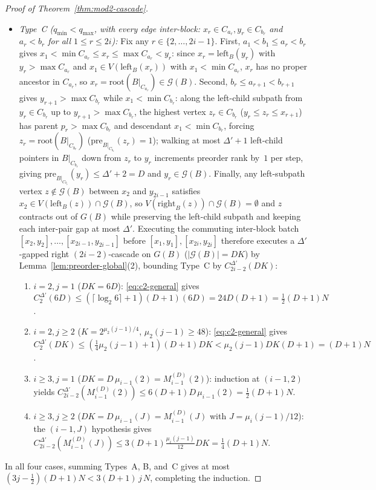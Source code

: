 \documentclass[11pt]{article}
\theoremstyle{definition}
\theoremstyle{remark}
\begin{document}
\begin{proof}[Proof of Theorem~\ref{thm:mod2-cascade}]
\begin{itemize}[leftmargin=2em]
  \item \emph{Type~C ($q_{\min} < q_{\max}$, with every edge inter-block: $x_r \in C_{a_r}, y_r \in C_{b_r}$ and $a_r < b_r$ for all $1 \le r \le 2i$):} Fix any $r \in \{2, \dots, 2i - 1\}$. First, $a_1 < b_1 \le a_r < b_r$ gives $x_1 < \min C_{a_r} \le x_r \le \max C_{a_r} < y_r$: since $x_r = \mathrm{left}_B(y_r)$ with $y_r > \max C_{a_r}$ and $x_1 \in V(\mathrm{left}_B(x_r))$ with $x_1 < \min C_{a_r}$, $x_r$ has no proper ancestor in $C_{a_r}$, so $x_r = \mathrm{root}(B|_{C_{a_r}}) \in \mathcal{G}(B)$. Second, $b_r \le a_{r+1} < b_{r+1}$ gives $y_{r+1} > \max C_{b_r}$ while $x_1 < \min C_{b_r}$: along the left-child subpath from $y_r \in C_{b_r}$ up to $y_{r+1} > \max C_{b_r}$, the highest vertex $z_r \in C_{b_r}$ ($y_r \le z_r \le x_{r+1}$) has parent $p_r > \max C_{b_r}$ and descendant $x_1 < \min C_{b_r}$, forcing $z_r = \mathrm{root}(B|_{C_{b_r}})$ ($\mathrm{pre}_{B|_{C_{b_r}}}(z_r) = 1$); walking at most $\Delta' + 1$ left-child pointers in $B|_{C_{b_r}}$ down from $z_r$ to $y_r$ increments preorder rank by~$1$ per step, giving $\mathrm{pre}_{B|_{C_{b_r}}}(y_r) \le \Delta' + 2 = D$ and $y_r \in \mathcal{G}(B)$. Finally, any left-subpath vertex $z \notin \mathcal{G}(B)$ between $x_2$ and $y_{2i-1}$ satisfies $x_2 \in V(\mathrm{left}_B(z)) \cap \mathcal{G}(B)$, so $V(\mathrm{right}_B(z)) \cap \mathcal{G}(B) = \emptyset$ and $z$ contracts out of $G(B)$ while preserving the left-child subpath and keeping each inter-pair gap at most $\Delta'$. Executing the commuting inter-block batch $[x_2, y_2], \dots, [x_{2i-1}, y_{2i-1}]$ before $[x_1, y_1], [x_{2i}, y_{2i}]$ therefore executes a $\Delta'$-gapped right $(2i - 2)$-cascade on $G(B)$ ($|\mathcal{G}(B)| = D K$) by Lemma~\ref{lem:preorder-global}(2), bounding Type~C by $C^{\Delta'}_{2i-2}(D K)$:
  \begin{enumerate}[label=(\roman*)]
    \item $i = 2, j = 1$ ($D K = 6D$): \eqref{eq:c2-general} gives $C^{\Delta'}_2(6D) \le (\lceil \log_2 6 \rceil + 1)(D + 1)(6D) = 24 D(D + 1) = \frac{1}{2}(D + 1) N$.
    \item $i = 2, j \ge 2$ ($K = 2^{\mu_2(j-1)/4}$, $\mu_2(j - 1) \ge 48$): \eqref{eq:c2-general} gives $C^{\Delta'}_2(D K) \le (\frac{1}{4}\mu_2(j - 1) + 1)(D + 1) D K < \mu_2(j - 1) D K (D + 1) = (D + 1) N$.
    \item $i \ge 3, j = 1$ ($D K = D\,\mu_{i-1}(2) = M^{(D)}_{i-1}(2)$): induction at $(i - 1, 2)$ yields $C^{\Delta'}_{2i-2}(M^{(D)}_{i-1}(2)) \le 6(D + 1) D\,\mu_{i-1}(2) = \frac{1}{2}(D + 1) N$.
    \item $i \ge 3, j \ge 2$ ($D K = D\,\mu_{i-1}(J) = M^{(D)}_{i-1}(J)$ with $J = \mu_i(j - 1)/12$): the $(i - 1, J)$ hypothesis gives $C^{\Delta'}_{2i-2}(M^{(D)}_{i-1}(J)) \le 3(D + 1) \frac{\mu_i(j-1)}{12} D K = \frac{1}{4}(D + 1) N$.
  \end{enumerate}
\end{itemize}
In all four cases, summing Types~A, B, and~C gives at most $(3j - \frac{1}{2})(D + 1) N < 3(D + 1)\,j\,N$, completing the induction.


\end{proof}
\end{document}
